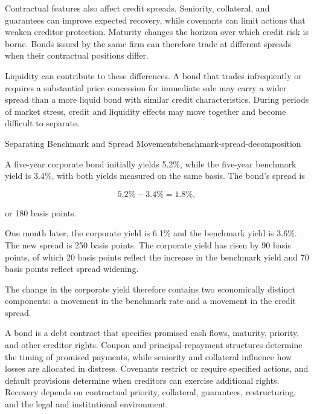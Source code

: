 Contractual features also affect credit spreads. Seniority, collateral, and guarantees can improve expected recovery, while covenants can limit actions that weaken creditor protection. Maturity changes the horizon over which credit risk is borne. Bonds issued by the same firm can therefore trade at different spreads when their contractual positions differ.

Liquidity can contribute to these differences. A bond that trades infrequently or requires a substantial price concession for immediate sale may carry a wider spread than a more liquid bond with similar credit characteristics. During periods of market stress, credit and liquidity effects may move together and become difficult to separate.

\begin{example}{Separating Benchmark and Spread Movements}{benchmark-spread-decomposition}

A five-year corporate bond initially yields 5.2\%, while the five-year benchmark yield is 3.4\%, with both yields measured on the same basis. The bond's spread is

\[
5.2\%-3.4\%=1.8\%,
\]

or 180 basis points.

One month later, the corporate yield is 6.1\% and the benchmark yield is 3.6\%. The new spread is 250 basis points. The corporate yield has risen by 90 basis points, of which 20 basis points reflect the increase in the benchmark yield and 70 basis points reflect spread widening.

The change in the corporate yield therefore contains two economically distinct components: a movement in the benchmark rate and a movement in the credit spread.

\end{example}



A bond is a debt contract that specifies promised cash flows, maturity, priority, and other creditor rights. Coupon and principal-repayment structures determine the timing of promised payments, while seniority and collateral influence how losses are allocated in distress. Covenants restrict or require specified actions, and default provisions determine when creditors can exercise additional rights. Recovery depends on contractual priority, collateral, guarantees, restructuring, and the legal and institutional environment.


